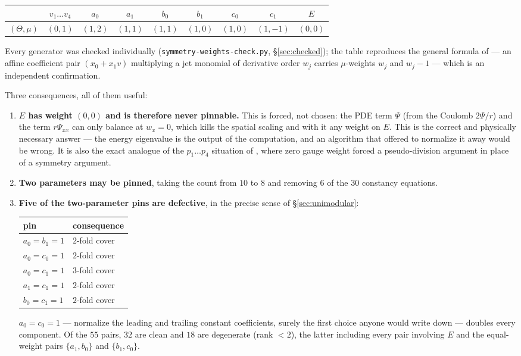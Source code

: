 \documentclass[11pt]{article}
\newcommand{\code}[1]{\texttt{#1}}
\theoremstyle{plain}
\theoremstyle{definition}
\theoremstyle{remark}
\begin{document}
\begin{center}
\begin{tabular}{l c c c c c c c c}
\toprule
 & $v_1 \ldots v_4$ & $a_0$ & $a_1$ & $b_0$ & $b_1$ & $c_0$ & $c_1$ & $E$ \\
\midrule
$(\Theta, \mu)$ & $(0,1)$ & $(1,2)$ & $(1,1)$ & $(1,1)$ & $(1,0)$ & $(1,0)$ & $(1,-1)$ & $(0,0)$ \\
\bottomrule
\end{tabular}
\end{center}

Every generator was checked individually
(\code{symmetry-weights-check.py}, \S\ref{sec:checked}); the table reproduces
the general formula of \cite{ansatz25} --- an affine coefficient pair
$(x_0 + x_1 v)$ multiplying a jet monomial of derivative order $w_j$ carries
$\mu$-weights $w_j$ and $w_j - 1$ --- which is an independent confirmation.

Three consequences, all of them useful:

\begin{enumerate}
\item \textbf{$E$ has weight $(0,0)$ and is therefore never pinnable.} This is
      forced, not chosen: the PDE term $\Psi$ (from the Coulomb $2\Psi/r$) and
      the term $r\Psi_{xx}$ can only balance at $w_x = 0$, which kills the
      spatial scaling and with it any weight on $E$. This is the correct and
      physically necessary answer --- the energy eigenvalue is the output of
      the computation, and an algorithm that offered to normalize it away would
      be wrong. It is also the exact analogue of the $p_1 \ldots p_4$ situation
      of \cite{ansatz25}, where zero gauge weight forced a pseudo-division
      argument in place of a symmetry argument.
\item \textbf{Two parameters may be pinned}, taking the count from $10$ to $8$
      and removing $6$ of the $30$ constancy equations.
\item \textbf{Five of the two-parameter pins are defective}, in the precise
      sense of \S\ref{sec:unimodular}:
      \begin{center}
      \begin{tabular}{l l}
      \toprule
      pin & consequence \\
      \midrule
      $a_0 = b_1 = 1$ & $2$-fold cover \\
      $a_0 = c_0 = 1$ & $2$-fold cover \\
      $a_0 = c_1 = 1$ & $3$-fold cover \\
      $a_1 = c_1 = 1$ & $2$-fold cover \\
      $b_0 = c_1 = 1$ & $2$-fold cover \\
      \bottomrule
      \end{tabular}
      \end{center}
      $a_0 = c_0 = 1$ --- normalize the leading and trailing constant
      coefficients, surely the first choice anyone would write down --- doubles
      every component. Of the $55$ pairs, $32$ are clean and $18$ are
      degenerate (rank $<2$), the latter including every pair involving $E$ and
      the equal-weight pairs $\{a_1, b_0\}$ and $\{b_1, c_0\}$.
\end{enumerate}
\end{document}
